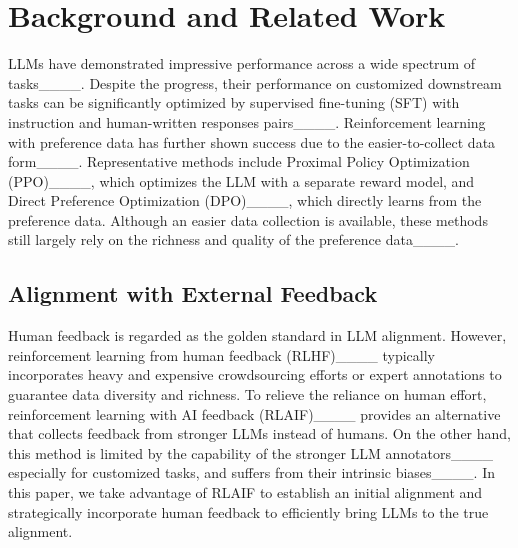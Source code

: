 \section{Background and Related Work}
LLMs have demonstrated impressive performance across a wide spectrum of tasks____. Despite the progress, their performance on customized downstream tasks can be significantly optimized by supervised fine-tuning (SFT) with instruction and human-written responses pairs____. Reinforcement learning with preference data has further shown success due to the easier-to-collect data form____. Representative methods include Proximal Policy Optimization
(PPO)____, which optimizes the LLM with a separate reward model, and Direct Preference Optimization (DPO)____, which directly learns from the preference data. Although an easier data collection is available, these methods still largely rely on the richness and quality of the preference data____.

\vspace{-0.1in}

\subsection{Alignment with External Feedback}
\vspace{-0.05in}
Human feedback is regarded as the golden standard in LLM alignment. However, reinforcement learning from human feedback (RLHF)____ typically incorporates heavy and expensive crowdsourcing efforts or expert annotations to guarantee data diversity and richness. To relieve the reliance on human effort, reinforcement learning with AI feedback (RLAIF)____ provides an alternative that collects feedback from stronger LLMs instead of humans. On the other hand, this method is limited by the capability of the stronger LLM annotators____ especially for customized tasks, and suffers from their intrinsic biases____.
In this paper, we take advantage of RLAIF to establish an initial alignment and strategically incorporate human feedback to efficiently bring LLMs to the true alignment.
    
